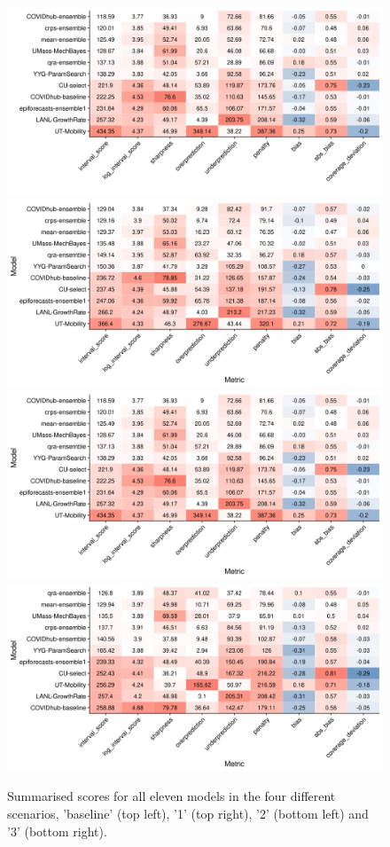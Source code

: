 \documentclass[
]{book}
\begin{document}
\begin{figure}
\includegraphics[width=0.5\linewidth]{../visualisation/chapter-5-results/scenario-baseline/coloured-summarised-scores} \includegraphics[width=0.5\linewidth]{../visualisation/chapter-5-results/scenario-1/coloured-summarised-scores} \includegraphics[width=0.5\linewidth]{../visualisation/chapter-5-results/scenario-2/coloured-summarised-scores} \includegraphics[width=0.5\linewidth]{../visualisation/chapter-5-results/scenario-3/coloured-summarised-scores} \caption{Summarised scores for all eleven models in the four different scenarios, 'baseline' (top left), '1' (top right), '2' (bottom left) and '3' (bottom right).}\label{fig:sensitivity}
\end{figure}
\end{document}
